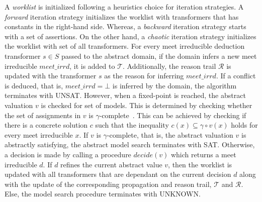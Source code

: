 A {\em worklist} is initialized following a heuristics choice for iteration 
strategies. A {\em forward} iteration strategy initializes the worklist with 
transformers that has constants in the right-hand side. Whereas, a {\em backward} 
iteration strategy starts with a set of assertions. On the other hand, a 
{\em chaotic} iteration strategy initializes the worklist with set of all 
transformers.  For every meet irreducible deduction transformer $s \in S$ 
passed to the abstract domain, if the domain infers a new meet irreducible 
$\mathit{meet\_irrd}$, it is added to $\mathcal{T}$.  Additionally, the reason 
trail $\mathcal{R}$ is updated with the transformer $s$ as the reason for inferring
$\mathit{meet\_irrd}$. If a conflict is deduced, that is, $\mathit{meet\_irrd} = \bot$ 
is inferred by the domain, the algorithm terminates with UNSAT.  However,
when a fixed-point is reached, the abstract valuation $v$ is checked for set of
models.  This is determined by checking whether the set of assignments in $v$ is 
$\gamma$-complete~\cite{gamma}.  This can be achieved by checking if there is a 
concrete solution $c$ such that the inequality $c(x) \subseteq \gamma \circ
v(x)$ holds for every meet irreducible $x$.  If $v$ is $\gamma$-complete, that is, the 
abstract valuation $v$ is abstractly satisfying, the abstract model 
search terminates with SAT.  Otherwise, a decision is made by calling a 
procedure $decide(v)$ which returns a meet irreducible $d$.  If $d$ refines the 
current abstract value $v$, then the worklist is updated with all transformers that are dependant on the current decision $d$ along with the update of the corresponding propagation and reason trail,
$\mathcal{T}$ and $\mathcal{R}$. Else, the model search procedure 
terminates with UNKNOWN.      


